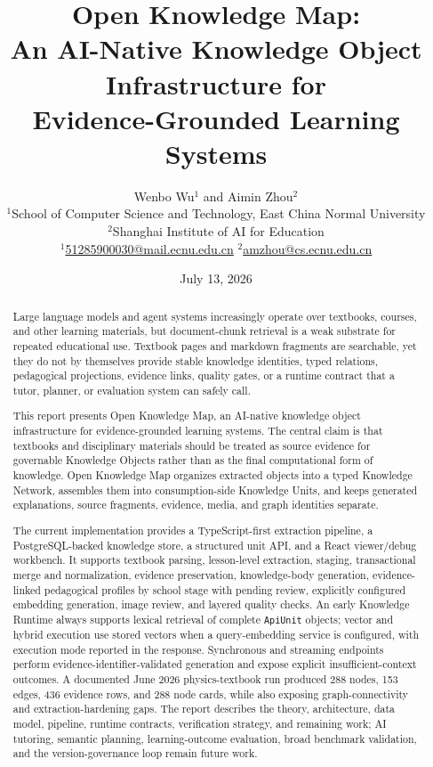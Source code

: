 \documentclass[11pt,letterpaper]{article}
\title{
  \bfseries\LARGE Open Knowledge Map:\\
  An AI-Native Knowledge Object Infrastructure for\\
  Evidence-Grounded Learning Systems
}
\author{
  \begin{tabular}{c}
    Wenbo Wu$^{1}$ \quad and \quad Aimin Zhou$^{2}$\\[0.35em]
    \small $^{1}$School of Computer Science and Technology, East China Normal University\\
    \small $^{2}$Shanghai Institute of AI for Education\\[0.35em]
    \small $^{1}$\href{mailto:51285900030@mail.ecnu.edu.cn}{51285900030@mail.ecnu.edu.cn}
    \qquad
    $^{2}$\href{mailto:amzhou@cs.ecnu.edu.cn}{amzhou@cs.ecnu.edu.cn}
  \end{tabular}
}
\date{July 13, 2026}
\newcommand{\code}[1]{\nolinkurl{#1}}
\newcommand{\OKM}{Open Knowledge Map}
\begin{document}
\maketitle
\vspace{-0.25em}

\begin{abstract}
Large language models and agent systems increasingly operate over textbooks, courses, and other learning materials, but document-chunk retrieval is a weak substrate for repeated educational use. Textbook pages and markdown fragments are searchable, yet they do not by themselves provide stable knowledge identities, typed relations, pedagogical projections, evidence links, quality gates, or a runtime contract that a tutor, planner, or evaluation system can safely call.

This report presents \OKM, an AI-native knowledge object infrastructure for evidence-grounded learning systems. The central claim is that textbooks and disciplinary materials should be treated as source evidence for governable Knowledge Objects rather than as the final computational form of knowledge. \OKM{} organizes extracted objects into a typed Knowledge Network, assembles them into consumption-side Knowledge Units, and keeps generated explanations, source fragments, evidence, media, and graph identities separate.

The current implementation provides a TypeScript-first extraction pipeline, a PostgreSQL-backed knowledge store, a structured unit API, and a React viewer/debug workbench. It supports textbook parsing, lesson-level extraction, staging, transactional merge and normalization, evidence preservation, knowledge-body generation, evidence-linked pedagogical profiles by school stage with pending review, explicitly configured embedding generation, image review, and layered quality checks. An early Knowledge Runtime always supports lexical retrieval of complete \code{ApiUnit} objects; vector and hybrid execution use stored vectors when a query-embedding service is configured, with execution mode reported in the response. Synchronous and streaming endpoints perform evidence-identifier-validated generation and expose explicit insufficient-context outcomes. A documented June 2026 physics-textbook run produced 288 nodes, 153 edges, 436 evidence rows, and 288 node cards, while also exposing graph-connectivity and extraction-hardening gaps. The report describes the theory, architecture, data model, pipeline, runtime contracts, verification strategy, and remaining work; AI tutoring, semantic planning, learning-outcome evaluation, broad benchmark validation, and the version-governance loop remain future work.
\end{abstract}
\end{document}

